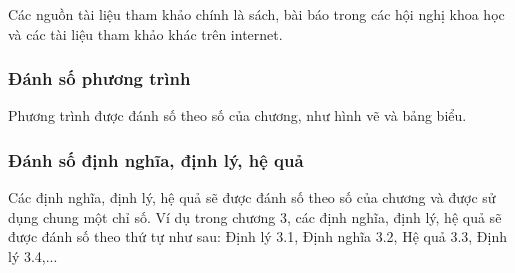 \documentclass{article} %
\begin{document}
Các nguồn tài liệu tham khảo chính là sách, bài báo trong các hội nghị khoa học và các tài liệu tham khảo khác trên
internet.

 \subsubsection{Đánh số phương trình}
 \vspace{-30pt}
 Phương trình được đánh số theo số của chương, như hình vẽ và bảng biểu.
 \subsubsection{Đánh số định nghĩa, định lý, hệ quả}
 \vspace{-30pt}
 Các định nghĩa, định lý, hệ quả sẽ được đánh số theo số của chương và được sử dụng chung một chỉ số. Ví dụ trong
 chương 3, các định nghĩa, định lý, hệ quả sẽ được đánh số theo thứ tự như sau: Định lý 3.1, Định nghĩa 3.2, Hệ quả
 3.3, Định lý 3.4,...
\end{document}
